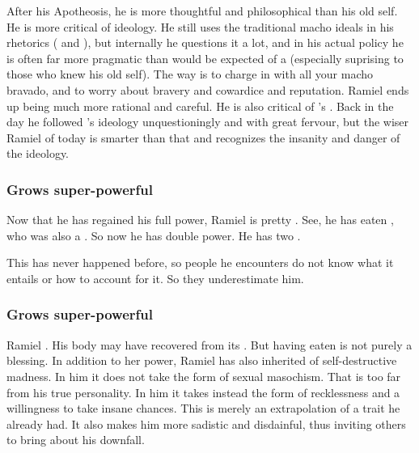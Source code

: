 After his Apotheosis, he is more thoughtful and philosophical than his old self. 
He is more critical of \Mystraacht ideology. 
He still uses the traditional \Mystraacht macho ideals in his rhetorics ( and ), but internally he questions it a lot, and in his actual policy he is often far more pragmatic than would be expected of a \Mystraacht (especially suprising to those who knew his old self). 
The \Mystraacht way is to charge in with all your macho bravado, and to worry about bravery and cowardice and reputation. 
Ramiel ends up being much more rational and careful.
He is also critical of \Zachirah's . 
Back in the day he followed \Zachirah's ideology unquestioningly and with great fervour, but the wiser Ramiel of today is smarter than that and recognizes the insanity and danger of the ideology. 





\subsubsection{Grows super-powerful}
Now that he has regained his full \sathariah{} power, Ramiel is pretty \uber. 
See, he has eaten \Belzir, who was also a \sathariah. 
So now he has double \sathariah{} power. 
He has two . 

This has never happened before, so people he encounters do not know what it entails or how to account for it. 
So they underestimate him. 





\subsubsection{Grows super-powerful}
Ramiel .
His body may have recovered from its .
But having eaten \Shiaraid is not purely a blessing. 
In addition to her power, Ramiel has also inherited  of self-destructive madness. 
In him it does not take the form of sexual masochism. 
That is too far from his true personality. 
In him it takes instead the form of recklessness and a willingness to take insane chances. 
This is merely an extrapolation of a trait he already had. 
It also makes him more sadistic and disdainful, thus inviting others to bring about his downfall. 


